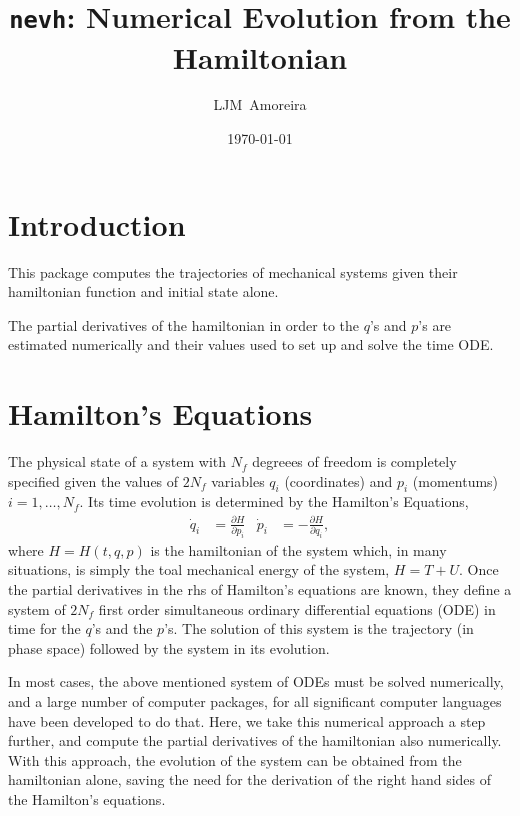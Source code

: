\documentclass{article}
\title{\texttt{nevh}: Numerical Evolution from the Hamiltonian}
\date{\today}
\author{LJM~Amoreira}
\newcommand{\pd}[2]{\frac{\partial#1}{\partial#2}}
\begin{document}
\maketitle
\section{Introduction}
This package computes the trajectories of mechanical systems given their
hamiltonian function and initial state alone.

The partial derivatives of the hamiltonian in order to the $q$'s and $p$'s are
estimated numerically and their values used to set up and solve the time ODE.

\section{Hamilton's Equations}
The physical state of a system with $N_f$ degreees of freedom is completely
specified given the values of $2N_f$ variables $q_i$ (coordinates) and $p_i$
(momentums) $i=1,\ldots,N_f$.  Its time evolution is determined by the
Hamilton's Equations,
\begin{align}
  \dot q_i&=\pd{H}{p_i}&
  \dot p_i&=-\pd{H}{q_i},
\end{align}
where $H=H(t,q,p)$ is the hamiltonian of the system which, in many situations,
is simply the toal mechanical energy of the system, $H=T+U$. Once the partial
derivatives in the rhs of Hamilton's equations are known, they define a system
of $2N_f$ first order simultaneous ordinary differential equations (ODE) in time
for the $q$'s and the $p$'s. The solution of this system is the trajectory (in
phase space) followed by the system in its evolution.

In most cases, the above mentioned system of ODEs must be solved numerically,
and a large number of computer packages, for all significant computer languages
have been developed to do that. Here, we take this numerical approach a step
further, and compute the partial derivatives of the hamiltonian also
numerically. With this approach, the evolution of the system can be obtained
from the hamiltonian alone, saving the need for the derivation of the right hand
sides of the Hamilton's equations. 
\end{document}
